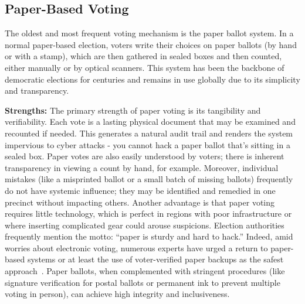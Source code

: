 \documentclass[a4paper,10pt]{report}
\begin{document}
\subsection{Paper-Based Voting}

The oldest and most frequent voting mechanism is the paper ballot system.   In a normal paper-based election, voters write their choices on paper ballots (by hand or with a stamp), which are then gathered in sealed boxes and then counted, either manually or by optical scanners.   This system has been the backbone of democratic elections for centuries and remains in use globally due to its simplicity and transparency.

  \textbf  {Strengths:}   The primary strength of paper voting is its tangibility and verifiability.   Each vote is a lasting physical document that may be examined and recounted if needed.   This generates a natural audit trail and renders the system impervious to cyber attacks - you cannot hack a paper ballot that’s sitting in a sealed box.   Paper votes are also easily understood by voters; there is inherent transparency in viewing a count by hand, for example.   Moreover, individual mistakes (like a misprinted ballot or a small batch of missing ballots) frequently do not have systemic influence; they may be identified and remedied in one precinct without impacting others.   Another advantage is that paper voting requires little technology, which is perfect in regions with poor infrastructure or where inserting complicated gear could arouse suspicions.   Election authorities frequently mention the motto: ``paper is sturdy and hard to hack.''   Indeed, amid worries about electronic voting, numerous experts have urged a return to paper-based systems or at least the use of voter-verified paper backups as the safest approach~\cite{brookings2018paper}.   Paper ballots, when complemented with stringent procedures (like signature verification for postal ballots or permanent ink to prevent multiple voting in person), can achieve high integrity and inclusiveness.
\end{document}
